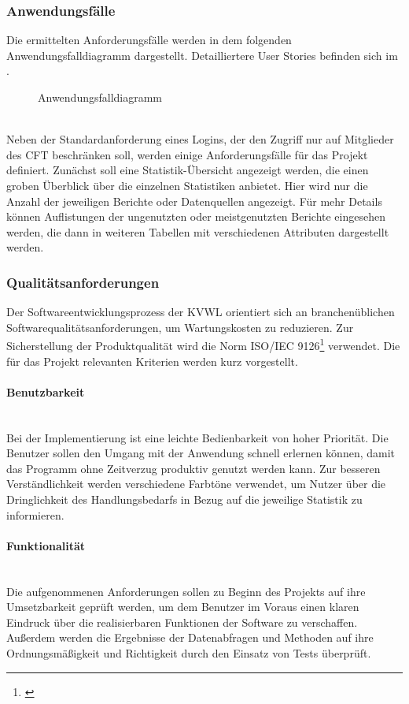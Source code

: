 \subsubsection{Anwendungsfälle}
\label{sec:Anwendungsfaelle}
Die ermittelten Anforderungsfälle werden in dem folgenden Anwendungsfalldiagramm dargestellt. Detailliertere User Stories befinden sich im .
\begin{figure}[htb]
	\centering
	\caption{Anwendungsfalldiagramm}
	\label{fig:Anwendungsfalldiagramm}
\end{figure}\\
Neben der Standardanforderung eines Logins, der den Zugriff nur auf Mitglieder des \ac{CFT} \teamName beschränken soll, werden einige Anforderungsfälle für das Projekt definiert. Zunächst soll eine Statistik-Übersicht angezeigt werden, die einen groben Überblick über die einzelnen Statistiken anbietet. Hier wird nur die Anzahl der jeweiligen Berichte oder Datenquellen angezeigt. Für mehr Details können Auflistungen \zB der ungenutzten oder meistgenutzten Berichte eingesehen werden, die dann in weiteren Tabellen mit verschiedenen Attributen dargestellt werden.

\subsubsection{Qualitätsanforderungen}
\label{sec:Qualitaetsanforderungen}
Der Softwareentwicklungsprozess der \ac{KVWL} orientiert sich an branchenüblichen Softwarequalitätsanforderungen, um Wartungskosten zu reduzieren. Zur Sicherstellung der Produktqualität wird die Norm ISO/IEC 9126\footnote{\cite{ISO9126}} verwendet. Die für das Projekt relevanten Kriterien werden kurz vorgestellt.

\paragraph{Benutzbarkeit} ~\\
\label{p:Benutzbarkeit}
Bei der Implementierung ist eine leichte Bedienbarkeit von hoher Priorität. Die Benutzer sollen den Umgang mit der Anwendung schnell erlernen können, damit das Programm ohne Zeitverzug produktiv genutzt werden kann. Zur besseren Verständlichkeit werden verschiedene Farbtöne verwendet, um Nutzer über die Dringlichkeit des Handlungsbedarfs in Bezug auf die jeweilige Statistik zu informieren.

\paragraph{Funktionalität} ~\\
\label{p:Funktionalitaet}
Die aufgenommenen Anforderungen sollen zu Beginn des Projekts auf ihre Umsetzbarkeit geprüft werden, um dem Benutzer im Voraus einen klaren Eindruck über die realisierbaren Funktionen der Software zu verschaffen. Außerdem werden die Ergebnisse der Datenabfragen und Methoden auf ihre Ordnungsmäßigkeit und Richtigkeit durch den Einsatz von Tests überprüft.

